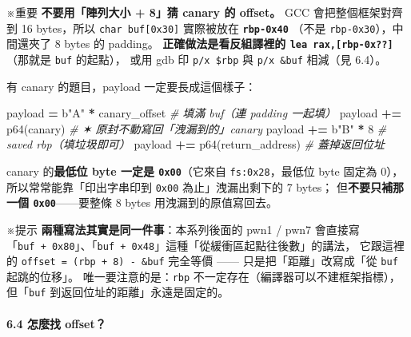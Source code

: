 \documentclass[10pt,a4paper]{article}
\newenvironment{Shaded}{\begin{snugshade}}{\end{snugshade}}
\newcommand{\CommentTok}[1]{\textcolor[rgb]{0.56,0.35,0.01}{\textit{#1}}}
\newcommand{\DecValTok}[1]{\textcolor[rgb]{0.00,0.00,0.81}{#1}}
\newcommand{\NormalTok}[1]{#1}
\newcommand{\OperatorTok}[1]{\textcolor[rgb]{0.81,0.36,0.00}{\textbf{#1}}}
\newcommand{\StringTok}[1]{\textcolor[rgb]{0.31,0.60,0.02}{#1}}
\renewenvironment{Shaded}{%
  \def\FrameCommand{\fboxsep=3.2pt\colorbox{shadecolor}}%
  \MakeFramed{\advance\hsize-\width\FrameRestore\small}%
}{%
  \endMakeFramed
}
\renewenvironment{quote}{%
  \begin{mdframed}[linewidth=0pt,innerleftmargin=0pt,innerrightmargin=0pt,
    innerbottommargin=0pt,innertopmargin=0pt,skipabove=0.55em,skipbelow=0.55em,
    leftmargin=0.9em,rightmargin=0.4em,startcode={\color{quotebar}\vrule width 2.6pt},%
    endcode={}]%
  \itshape\color{black}%
}{%
  \end{mdframed}%
}
\begin{document}
\begin{quote}
※重要 \textbf{不要用「陣列大小 + 8」猜 canary 的 offset。} GCC
會把整個框架對齊到 16 bytes，所以 \texttt{char\ \allowbreak{}buf{[}0x30{]}}
實際被放在 \textbf{\texttt{rbp-\allowbreak{}0x40}} （不是
\texttt{rbp-\allowbreak{}0x30}），中間還夾了 8 bytes 的 padding。
\textbf{正確做法是看反組譯裡的 \texttt{lea\ \allowbreak{}rax,{[}rbp-\allowbreak{}0x??{]}}}（那就是
\texttt{buf} 的起點）， 或用 gdb 印 \texttt{p/\allowbreak{}x\ \allowbreak{}\$\allowbreak{}rbp} 與
\texttt{p/\allowbreak{}x\ \allowbreak{}\&\allowbreak{}buf} 相減（見 6.4）。
\end{quote}

有 canary 的題目，payload 一定要長成這個樣子：

\begin{Shaded}
\begin{Highlighting}[]
\NormalTok{payload  }\OperatorTok{=} \StringTok{b"A"} \OperatorTok{*}\NormalTok{ canary\_offset      }\CommentTok{\# 填滿 buf（連 padding 一起填）}
\NormalTok{payload }\OperatorTok{+=}\NormalTok{ p64(canary)               }\CommentTok{\# ✶ 原封不動寫回「洩漏到的」canary}
\NormalTok{payload }\OperatorTok{+=} \StringTok{b"B"} \OperatorTok{*} \DecValTok{8}                  \CommentTok{\# saved rbp（填垃圾即可）}
\NormalTok{payload }\OperatorTok{+=}\NormalTok{ p64(return\_address)       }\CommentTok{\# 蓋掉返回位址}
\end{Highlighting}
\end{Shaded}

canary 的\textbf{最低位 byte 一定是 \texttt{0x00}}（它來自
\texttt{fs:\allowbreak{}0x28}，最低位 byte 固定為 0）， 所以常常能靠「印出字串印到
\texttt{0x00} 為止」洩漏出剩下的 7 bytes； 但\textbf{不要只補那一個
\texttt{0x00}}------要整條 8 bytes 用洩漏到的原值寫回去。

\begin{quote}
※提示 \textbf{兩種寫法其實是同一件事}：本系列後面的 pwn1 / pwn7 會直接寫
「\texttt{buf\ \allowbreak{}+\ \allowbreak{}0x80}」、「\texttt{buf\ \allowbreak{}+\ \allowbreak{}0x48}」這種「從緩衝區起點往後數」的講法，
它跟這裡的 \texttt{offset\ \allowbreak{}=\ \allowbreak{}(rbp\ \allowbreak{}+\ \allowbreak{}8)\ \allowbreak{}-\allowbreak{}\ \allowbreak{}\&\allowbreak{}buf} 完全等價 ------
只是把「距離」改寫成「從 \texttt{buf} 起跳的位移」。
唯一要注意的是：\texttt{rbp} 不一定存在（編譯器可以不建框架指標），
但「\texttt{buf} 到返回位址的距離」永遠是固定的。
\end{quote}

\paragraph{6.4 怎麼找 offset？}\label{ux600eux9ebcux627e-offset}
\end{document}
